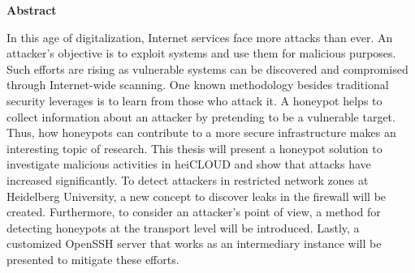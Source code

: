 \thispagestyle{empty}
\begin{center}
    \begin{minipage}[c][0.48\textheight][b]{0.9\textwidth}
        \small
        \begin{center}
            \textbf{Abstract}
        \end{center}\par
        \vspace{\baselineskip}
        In this age of digitalization, Internet services face more attacks than ever.
        An attacker's objective is to exploit systems and use them for malicious purposes.
        Such efforts are rising as vulnerable systems can be discovered and compromised through Internet-wide scanning.
        One known methodology besides traditional security leverages is to learn from those who attack it.
        A honeypot helps to collect information about an attacker by pretending to be a vulnerable target.
        Thus, how honeypots can contribute to a more secure infrastructure makes an interesting topic of research.
        This thesis will present a honeypot solution to investigate malicious activities in heiCLOUD and show that attacks have increased significantly.
        To detect attackers in restricted network zones at Heidelberg University, a new concept to discover leaks in the firewall will be created.
        Furthermore, to consider an attacker's point of view, a method for detecting honeypots at the transport level will be introduced.
        Lastly, a customized OpenSSH server that works as an intermediary instance will be presented to mitigate these efforts.
        \end{minipage}\par
    \vfill
\end{center}